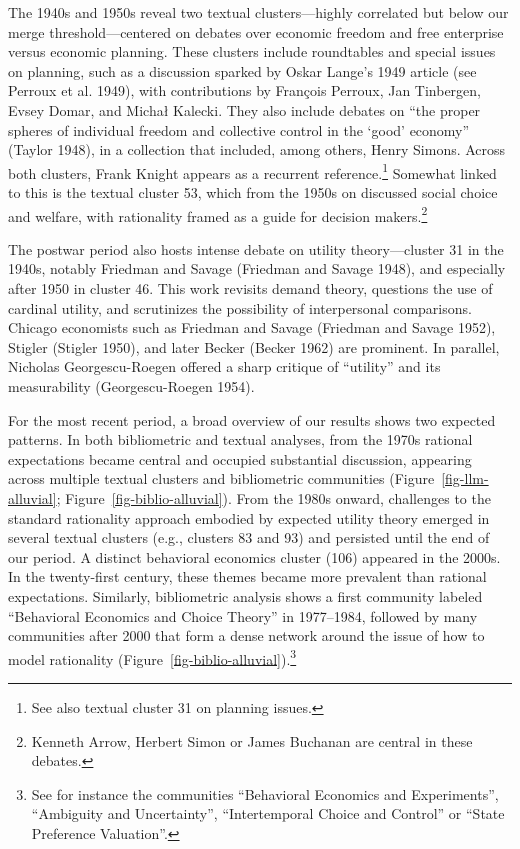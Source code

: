 \documentclass[
]{interact}
\begin{document}
The 1940s and 1950s reveal two textual clusters---highly correlated but
below our merge threshold---centered on debates over economic freedom
and free enterprise versus economic planning. These clusters include
roundtables and special issues on planning, such as a discussion sparked
by Oskar Lange's 1949 article (see Perroux et al. 1949), with
contributions by François Perroux, Jan Tinbergen, Evsey Domar, and
Michał Kalecki. They also include debates on ``the proper spheres of
individual freedom and collective control in the `good' economy''
(Taylor 1948), in a collection that included, among others, Henry
Simons. Across both clusters, Frank Knight appears as a recurrent
reference.\footnote{See also textual cluster 31 on planning issues.}
Somewhat linked to this is the textual cluster 53, which from the 1950s
on discussed social choice and welfare, with rationality framed as a
guide for decision makers.\footnote{Kenneth Arrow, Herbert Simon or
  James Buchanan are central in these debates.}

The postwar period also hosts intense debate on utility theory---cluster
31 in the 1940s, notably Friedman and Savage (Friedman and Savage 1948),
and especially after 1950 in cluster 46. This work revisits demand
theory, questions the use of cardinal utility, and scrutinizes the
possibility of interpersonal comparisons. Chicago economists such as
Friedman and Savage (Friedman and Savage 1952), Stigler (Stigler 1950),
and later Becker (Becker 1962) are prominent. In parallel, Nicholas
Georgescu-Roegen offered a sharp critique of ``utility'' and its
measurability (Georgescu-Roegen 1954).

For the most recent period, a broad overview of our results shows two
expected patterns. In both bibliometric and textual analyses, from the
1970s rational expectations became central and occupied substantial
discussion, appearing across multiple textual clusters and bibliometric
communities (Figure~\ref{fig-llm-alluvial};
Figure~\ref{fig-biblio-alluvial}). From the 1980s onward, challenges to
the standard rationality approach embodied by expected utility theory
emerged in several textual clusters (e.g., clusters 83 and 93) and
persisted until the end of our period. A distinct behavioral economics
cluster (106) appeared in the 2000s. In the twenty-first century, these
themes became more prevalent than rational expectations. Similarly,
bibliometric analysis shows a first community labeled ``Behavioral
Economics and Choice Theory'' in 1977--1984, followed by many
communities after 2000 that form a dense network around the issue of how
to model rationality (Figure~\ref{fig-biblio-alluvial}).\footnote{See
  for instance the communities ``Behavioral Economics and Experiments'',
  ``Ambiguity and Uncertainty'', ``Intertemporal Choice and Control'' or
  ``State Preference Valuation''.}
\end{document}
